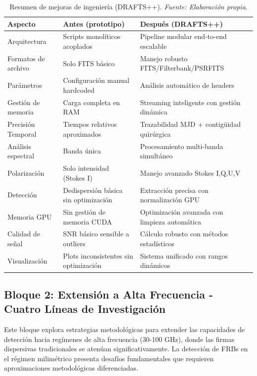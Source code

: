 \begin{table}[H] 
\centering 
  \caption{Resumen de mejoras de ingeniería (DRAFTS++). \textit{Fuente: Elaboración propia}.}
  \label{tab:mejoras}
\begin{tabular}{|l|l|l|} 
\toprule 
    \textbf{Aspecto} & \textbf{Antes (prototipo)} & \textbf{Después (DRAFTS++)} \\
\midrule 
Arquitectura & Scripts monolíticos acoplados & Pipeline modular end-to-end escalable \\ 
    Formatos de archivo & Solo FITS básico & Manejo robusto FITS/Filterbank/PSRFITS \\
    Parámetros & Configuración manual hardcoded & Análisis automático de headers \\
Gestión de memoria & Carga completa en RAM & Streaming inteligente con gestión dinámica \\
Precisión Temporal & Tiempos relativos aproximados & Trazabilidad MJD + contigüidad quirúrgica \\
Análisis espectral & Banda única & Procesamiento multi-banda simultáneo \\
Polarización & Solo intensidad (Stokes I) & Manejo avanzado Stokes I,Q,U,V \\
Detección & Dedispersión básica sin optimización & Extracción precisa con normalización GPU \\
Memoria GPU & Sin gestión de memoria CUDA & Optimización avanzada con limpieza automática \\
Calidad de señal & SNR básico sensible a outliers & Cálculo robusto con métodos estadísticos \\
Visualización & Plots inconsistentes sin optimización & Sistema unificado con rangos dinámicos \\
\bottomrule 
\end{tabular} 
\end{table}

\subsection{Bloque 2: Extensión a Alta Frecuencia - Cuatro Líneas de Investigación}

Este bloque explora estrategias metodológicas para extender las capacidades de detección hacia regímenes de alta frecuencia (30-100 GHz), donde las firmas dispersivas tradicionales se atenúan significativamente. La detección de FRBs en el régimen milimétrico presenta desafíos fundamentales que requieren aproximaciones metodológicas diferenciadas.

